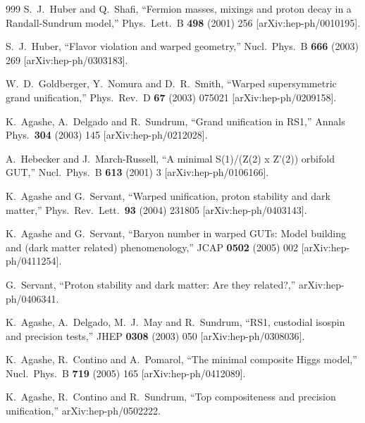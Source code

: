 \begin{thebibliography}{999}
  S.~J.~Huber and Q.~Shafi,
  ``Fermion masses, mixings and proton decay in a Randall-Sundrum model,''
  Phys.\ Lett.\ B {\bf 498} (2001) 256
  [arXiv:hep-ph/0010195].

  S.~J.~Huber,
  ``Flavor violation and warped geometry,''
  Nucl.\ Phys.\ B {\bf 666} (2003) 269
  [arXiv:hep-ph/0303183].

  W.~D.~Goldberger, Y.~Nomura and D.~R.~Smith,
  ``Warped supersymmetric grand unification,''
  Phys.\ Rev.\ D {\bf 67} (2003) 075021
  [arXiv:hep-ph/0209158].

  K.~Agashe, A.~Delgado and R.~Sundrum,
  ``Grand unification in RS1,''
  Annals Phys.\  {\bf 304} (2003) 145
  [arXiv:hep-ph/0212028].

  A.~Hebecker and J.~March-Russell,
  ``A minimal S(1)/(Z(2) x Z'(2)) orbifold GUT,''
  Nucl.\ Phys.\ B {\bf 613} (2001) 3
  [arXiv:hep-ph/0106166].

  K.~Agashe and G.~Servant,
  ``Warped unification, proton stability and dark matter,''
  Phys.\ Rev.\ Lett.\  {\bf 93} (2004) 231805
  [arXiv:hep-ph/0403143].

  K.~Agashe and G.~Servant,
  ``Baryon number in warped GUTs: Model building and (dark matter related)
  phenomenology,''
  JCAP {\bf 0502} (2005) 002
  [arXiv:hep-ph/0411254].

  G.~Servant,
  ``Proton stability and dark matter: Are they related?,''
  arXiv:hep-ph/0406341.

  K.~Agashe, A.~Delgado, M.~J.~May and R.~Sundrum,
  ``RS1, custodial isospin and precision tests,''
  JHEP {\bf 0308} (2003) 050
  [arXiv:hep-ph/0308036].

  K.~Agashe, R.~Contino and A.~Pomarol,
  ``The minimal composite Higgs model,''
  Nucl.\ Phys.\ B {\bf 719} (2005) 165
  [arXiv:hep-ph/0412089].

  K.~Agashe, R.~Contino and R.~Sundrum,
  ``Top compositeness and precision unification,''
  arXiv:hep-ph/0502222.


\end{thebibliography}
